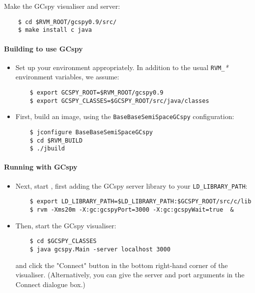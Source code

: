    Make the GCspy visualiser and server:

\begin{verbatim}
    $ cd $RVM_ROOT/gcspy0.9/src/
    $ make install c java
\end{verbatim}

\paragraph{Building \jrvm{} to use GCspy}

\begin{itemize}
  \item  Set up your environment appropriately.  In addition to the
    usual \texttt{RVM\_}\textit{*} environment variables, we assume:
   
\begin{verbatim}
    $ export GCSPY_ROOT=$RVM_ROOT/gcspy0.9
    $ export GCSPY_CLASSES=$GCSPY_ROOT/src/java/classes
\end{verbatim}

  \item First, build an image, using the
    \texttt{BaseBaseSemiSpaceGCspy} configuration: 
\begin{verbatim}
    $ jconfigure BaseBaseSemiSpaceGCspy
    $ cd $RVM_BUILD
    $ ./jbuild
\end{verbatim}
\end{itemize}

\paragraph{Running \jrvm{} with GCspy}

\begin{itemize}
   \item  Next, start \jrvm{}, first adding the GCspy server library to your {\tt LD\_LIBRARY\_PATH}:
\begin{verbatim}
    $ export LD_LIBRARY_PATH=$LD_LIBRARY_PATH:$GCSPY_ROOT/src/c/lib
    $ rvm -Xms20m -X:gc:gcspyPort=3000 -X:gc:gcspyWait=true  &
\end{verbatim}

   \item Then, start the GCspy visualiser:

\begin{verbatim}
    $ cd $GCSPY_CLASSES
    $ java gcspy.Main -server localhost 3000
\end{verbatim}

      and click the "Connect" button in the bottom right-hand corner
      of the visualiser.  (Alternatively, you can give the server and
      port arguments in the Connect dialogue box.)  

\end{itemize}

